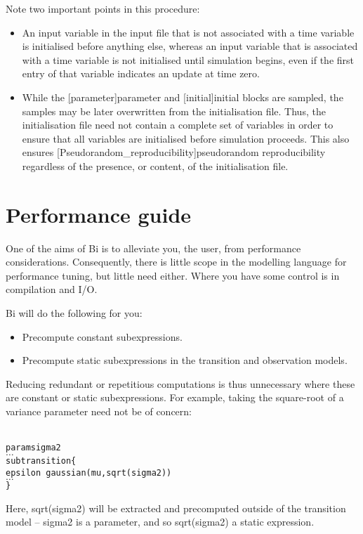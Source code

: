Note two important points in this procedure:
\begin{itemize}
\item An {\sf input} variable in the input file that is not associated with a
  time variable is initialised before anything else, whereas an {\sf input}
  variable that is associated with a time variable is not initialised until
  simulation begins, even if the first entry of that variable indicates an
  update at time zero.
\item While the \hyperref[hyper][parameter]{\sf parameter}
  and \hyperref[hyper][initial]{\sf initial} blocks are
  sampled, the samples may be later overwritten from the initialisation
  file. Thus, the initialisation file need not contain a complete set of
  variables in order to ensure that all variables are initialised before
  simulation proceeds. This also ensures
  \hyperref[hyper][Pseudorandom_reproducibility]{pseudorandom
    reproducibility} regardless of the presence,
  or content, of the initialisation file.
\end{itemize}

\section{Performance guide\label{Performance guide}}

One of the aims of Bi is to alleviate you, the user, from performance
considerations. Consequently, there is little scope in the modelling language
for performance tuning, but little need either. Where you have some control is
in compilation and I/O.

Bi will do the following for you:
\begin{itemize}
\item Precompute constant subexpressions.
\item Precompute static subexpressions in the transition and observation
  models.
\end{itemize}

Reducing redundant or repetitious computations is thus unnecessary where these
are constant or static subexpressions. For example, taking the square-root of
a variance parameter need not be of concern:
\begin{alltt}{\sf
    param sigma2
    \(\ldots\)
    sub transition \{
        epsilon ~ gaussian(mu, sqrt(sigma2))
        \(\ldots\)
    \}
}\end{alltt}
Here, \textsf{sqrt(sigma2)} will be extracted and precomputed outside of the
transition model -- \textsf{sigma2} is a parameter, and so
\textsf{sqrt(sigma2)} a static expression.


